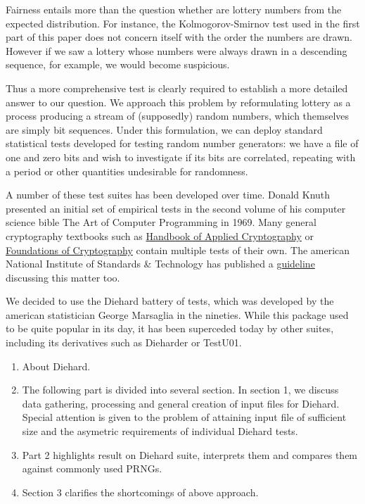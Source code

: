 Fairness entails more than the question whether are lottery numbers from the expected distribution. For instance, the Kolmogorov-Smirnov
test used in the first part of this paper does not concern itself with the order the numbers are drawn. However if we saw a lottery whose
numbers were always drawn in a descending sequence, for example, we would become suspicious.

Thus a more comprehensive test is clearly required to establish a more detailed answer to our question. We approach this problem by reformulating
lottery as a process producing a stream of (supposedly) random numbers, which themselves are simply bit sequences. Under this formulation,
we can deploy standard statistical tests developed for testing random number generators: we have a file of one and zero bits and wish to investigate
if its bits are correlated, repeating with a period or other quantities undesirable for randomness.

A number of these test suites has been developed over time. Donald Knuth presented an initial set of empirical tests in the second volume of his computer science bible
The Art of Computer Programming in 1969. Many general cryptography textbooks such as \href{http://www.cacr.math.uwaterloo.ca/hac/}{Handbook of Applied Cryptography} 
or \href{http://www.wisdom.weizmann.ac.il/~oded/foc-vol1.html}{Foundations of Cryptography} contain multiple tests of their own. The american National Institute 
of Standards \& Technology has published a \href{https://nvlpubs.nist.gov/nistpubs/legacy/sp/nistspecialpublication800-22r1a.pdf}{guideline} discussing this matter too.

We decided to use the Diehard battery of tests, which was developed by the american statistician George Marsaglia in the nineties. While this package used
to be quite popular in its day, it has been superceded today by other suites, including its derivatives such as Dieharder or TestU01. 

\begin{enumerate}
    \item About Diehard.
    \item The following part is divided into several section. In section 1, we discuss data gathering, processing and general creation of input files for Diehard. Special
    attention is given to the problem of attaining input file of sufficient size and the asymetric requirements of individual Diehard tests.
    \item Part 2 highlights result on Diehard suite, interprets them and compares them against commonly used PRNGs.
    \item Section 3 clarifies the shortcomings of above approach.
\end{enumerate}
